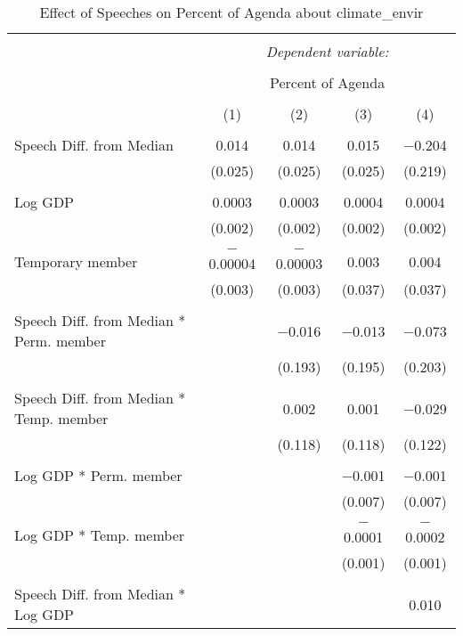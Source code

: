 
\begin{table}[!htbp] \centering 
  \caption{Effect of Speeches on Percent of Agenda about climate_envir} 
  \label{} 
\begin{tabular}{@{\extracolsep{5pt}}lcccc} 
\\[-1.8ex]\hline 
\hline \\[-1.8ex] 
 & \multicolumn{4}{c}{\textit{Dependent variable:}} \\ 
\cline{2-5} 
\\[-1.8ex] & \multicolumn{4}{c}{Percent of Agenda} \\ 
\\[-1.8ex] & (1) & (2) & (3) & (4)\\ 
\hline \\[-1.8ex] 
 Speech Diff. from Median & 0.014 & 0.014 & 0.015 & $-$0.204 \\ 
  & (0.025) & (0.025) & (0.025) & (0.219) \\ 
  & & & & \\ 
 Log GDP & 0.0003 & 0.0003 & 0.0004 & 0.0004 \\ 
  & (0.002) & (0.002) & (0.002) & (0.002) \\ 
  & & & & \\ 
 Temporary member & $-$0.00004 & $-$0.00003 & 0.003 & 0.004 \\ 
  & (0.003) & (0.003) & (0.037) & (0.037) \\ 
  & & & & \\ 
 Speech Diff. from Median * Perm. member &  & $-$0.016 & $-$0.013 & $-$0.073 \\ 
  &  & (0.193) & (0.195) & (0.203) \\ 
  & & & & \\ 
 Speech Diff. from Median * Temp. member &  & 0.002 & 0.001 & $-$0.029 \\ 
  &  & (0.118) & (0.118) & (0.122) \\ 
  & & & & \\ 
 Log GDP * Perm. member &  &  & $-$0.001 & $-$0.001 \\ 
  &  &  & (0.007) & (0.007) \\ 
  & & & & \\ 
 Log GDP * Temp. member &  &  & $-$0.0001 & $-$0.0002 \\ 
  &  &  & (0.001) & (0.001) \\ 
  & & & & \\ 
 Speech Diff. from Median * Log GDP &  &  &  & 0.010 \\ 

\end{tabular}
\end{table}
